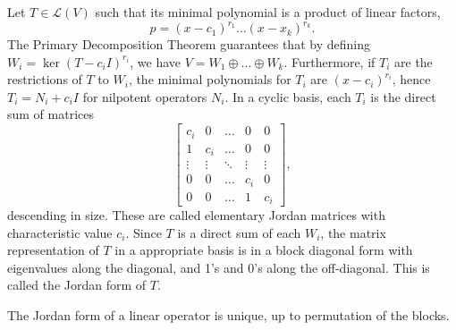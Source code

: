 \documentclass[11pt]{article}
\newcommand{\alg}[1]{\mathscr{#1}}
\newcommand{\algL}{\alg{L}}
\renewcommand{\ker}{\operatorname{ker}}
\theoremstyle{definition}
\theoremstyle{remark}
\numberwithin{equation}{section}
\begin{document}
    \begin{definition}
        Let $T \in \algL(V)$ such that its minimal polynomial is a product of
        linear factors, \[
            p = (x - c_1)^{r_1} \dots (x - x_k)^{r_k}.
        \] The Primary Decomposition Theorem guarantees that by defining $W_i =
        \ker{(T - c_iI)^{r_i}}$, we have $V = W_1 \oplus \dots \oplus W_k$.
        Furthermore, if $T_i$ are the restrictions of $T$ to $W_i$, the minimal
        polynomials for $T_i$ are $(x - c_i)^{r_i}$, hence $T_i = N_i + c_iI$ for
        nilpotent operators $N_i$. In a cyclic basis, each $T_i$ is the direct sum of
        matrices \[
            \begin{bmatrix}
                c_i & 0 & \dots & 0 & 0 \\
                1 & c_i & \dots & 0 & 0 \\
                \vdots & \vdots & \ddots & \vdots & \vdots \\
                0 & 0 & \dots & c_i & 0 \\
                0 & 0 & \dots & 1 & c_i
            \end{bmatrix},
        \] descending in size. These are called elementary Jordan matrices with
        characteristic value $c_i$. Since $T$ is a direct sum of each $W_i$, the
        matrix representation of $T$ in a appropriate basis is in a block diagonal
        form with eigenvalues along the diagonal, and 1's and 0's along the
        off-diagonal. This is called the Jordan form of $T$.
    \end{definition}

    \begin{theorem}
        The Jordan form of a linear operator is unique, up to permutation of the blocks.
    \end{theorem}
\end{document}
